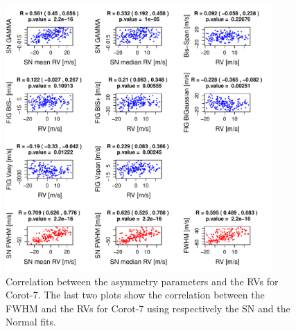 \documentclass[11pt, oneside]{article}
\begin{document}
%
\begin{figure}[htbp]
   \centering
\includegraphics[height = 4in]{LRa01_E_[4]Comparison_para.pdf} 
   \caption{Correlation between the asymmetry parameters and the RVs for Corot-7. The last two plots show the correlation between the FWHM and the RVs for Corot-7 using respectively the SN and the Normal fits.}
   \label{fig:Corot7:corrPlot}
\end{figure}
%


%


\end{document}

